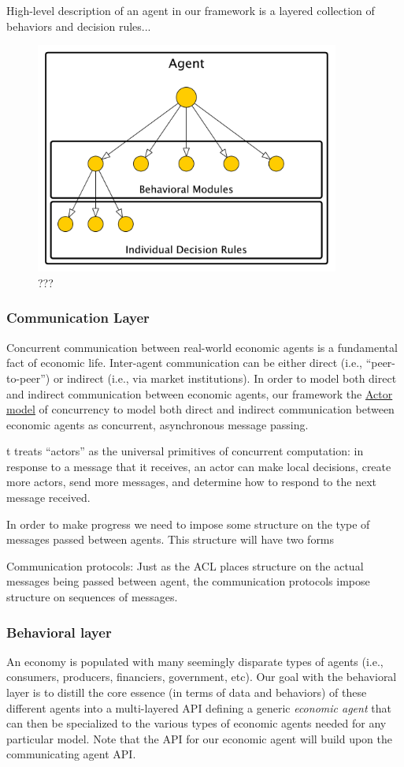 \documentclass[11pt]{amsart}
\begin{document}
High-level description of an agent in our framework is a layered collection of behaviors and decision rules...
\begin{figure}[H]
\centering
\includegraphics[width=10cm]{img/hierarchical-actor.pdf}
\caption{???}
\end{figure}

\subsubsection{Communication Layer}
Concurrent communication between real-world economic agents is a fundamental fact of economic life. Inter-agent communication can be either direct (i.e., ``peer-to-peer'') or indirect (i.e., via market institutions). In order to model both direct and indirect communication between economic agents, our framework  the \href{https://en.wikipedia.org/wiki/Actor_model}{Actor model} of concurrency to model both direct and indirect communication between economic agents as concurrent, asynchronous message passing.

t treats ``actors'' as the universal primitives of concurrent computation: in response to a message that it receives, an actor can make local decisions, create more actors, send more messages, and determine how to respond to the next message received.

In order to make progress we need to impose some structure on the type of messages passed between agents.  This structure will have two forms 


Communication protocols: Just as the ACL places structure on the actual messages being passed between agent, the communication protocols impose structure on sequences of messages.

\subsubsection{Behavioral layer}
An economy is populated with many seemingly disparate types of agents (i.e., consumers, producers, financiers, government, etc).  Our goal with the behavioral layer is to distill the core essence (in terms of data and behaviors) of these different agents into a multi-layered API defining a generic \textit{economic agent} that can then be specialized to the various types of economic agents needed for any particular model. Note that the API for our economic agent will build upon the communicating agent API.
\end{document}
